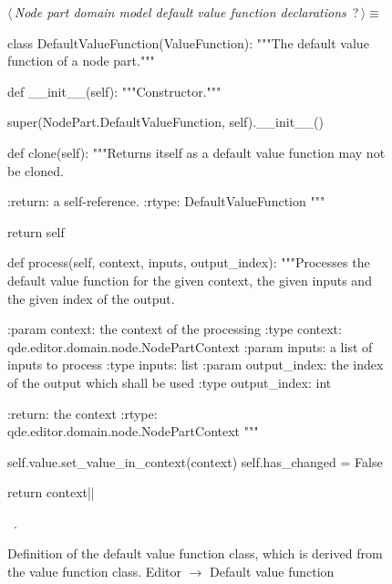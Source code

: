\documentclass[%
    a4paper,    %
    justified,  %
    nobib,      %
    openany     %
]{tufte-book}
\makeatletter
\renewcommand{\label}[1]{\@tufte@label{##1}}%
\makeatother
\begin{document}
\begin{figure}
\begin{flushleft} \small
\begin{minipage}{\linewidth}\label{scrap114}\raggedright\small
{} $\langle\,${\itshape Node part domain model default value function declarations}\nobreak\ {\footnotesize {?}}$\,\rangle\equiv$
\vspace{-1ex}
\begin{pythoncode}
class DefaultValueFunction(ValueFunction):
    """The default value function of a node part."""

    def __init__(self):
        """Constructor."""

        super(NodePart.DefaultValueFunction, self).__init__()

    def clone(self):
        """Returns itself as a default value function may not be cloned.

        :return: a self-reference.
        :rtype: DefaultValueFunction
        """

        return self

    def process(self, context, inputs, output_index):
        """Processes the default value function for the given context, the given inputs
        and the given index of the output.

        :param context: the context of the processing
        :type  context: qde.editor.domain.node.NodePartContext
        :param inputs: a list of inputs to process
        :type inputs: list
        :param output_index: the index of the output which shall be used
        :type output_index: int

        :return: the context
        :rtype:  qde.editor.domain.node.NodePartContext
        """

        self.value.set_value_in_context(context)
        self.has_changed = False

        return context|\NWsep|
\end{pythoncode}
\vspace{1.5ex}
\footnotesize
\begin{list}{}{\setlength{\itemsep}{-\parsep}\setlength{\itemindent}{-\leftmargin}}
\item \NWtxtMacroRefIn\ .

\item{}
\end{list}
\end{minipage}\vspace{4ex}
\end{flushleft}
\caption{Definition of the default value function class, which is derived from
  the value function class.
  \newline{}\newline{}Editor $\rightarrow$ Default value function}
\label{editor:lst:default-value-function}
\end{figure}
\end{document}
